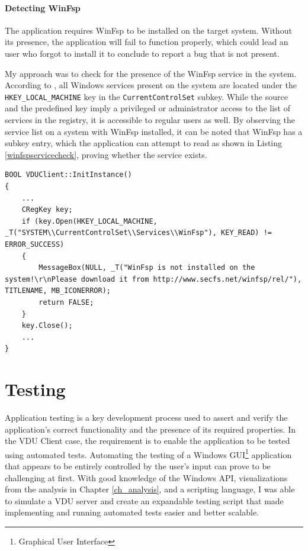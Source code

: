 \subsubsection{Detecting WinFsp}
The application requires WinFsp to be installed on the target system. Without its presence, the application will fail to function properly, which could lead an user who forgot to install it to conclude to report a bug that is not present.

My approach was to check for the presence of the WinFsp service in the system. According to \cite{WinHKLMCCS}, all Windows services present on the system are located under the \lstinline{HKEY_LOCAL_MACHINE} key in the \lstinline{CurrentControlSet} subkey. While the source and the predefined key imply a privileged or administrator access to the list of services in the registry, it is accessible to regular users as well. By observing the service list on a system with WinFsp installed, it can be noted that WinFsp has a subkey entry, which the application can attempt to read as shown in Listing \ref{winfspservicecheck}, proving whether the service exists.
\begin{lstlisting}[caption={Implementation of the WinFsp service detection.}, label=winfspservicecheck]
BOOL VDUClient::InitInstance()
{
    ...
    CRegKey key;
    if (key.Open(HKEY_LOCAL_MACHINE, _T("SYSTEM\\CurrentControlSet\\Services\\WinFsp"), KEY_READ) != ERROR_SUCCESS)
    {
    	MessageBox(NULL, _T("WinFsp is not installed on the system!\r\nPlease download it from http://www.secfs.net/winfsp/rel/"), TITLENAME, MB_ICONERROR);
    	return FALSE;
    }
    key.Close();
    ...
}
\end{lstlisting}


\chapter{Testing}
\label{ch_testing}
Application testing is a key development process used to assert and verify the application's correct functionality and the presence of its required properties. In the VDU Client case, the requirement is to enable the application to be tested using automated tests. Automating the testing of a Windows GUI\footnote{Graphical User Interface} application that appears to be entirely controlled by the user's input can prove to be challenging at first. With good knowledge of the Windows API, visualizations from the analysis in Chapter \ref{ch_analysis}, and a scripting language, I was able to simulate a VDU server and create an expandable testing script that made implementing and running automated tests easier and better scalable.

